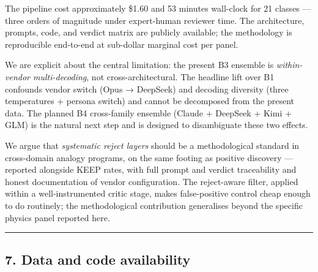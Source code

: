 \documentclass[
  letterpaper,
  11pt]{article}
\begin{document}
The pipeline cost approximately \$1.60 and 53 minutes wall-clock for 21
classes --- three orders of magnitude under expert-human reviewer time.
The architecture, prompts, code, and verdict matrix are publicly
available; the methodology is reproducible end-to-end at sub-dollar
marginal cost per panel.

We are explicit about the central limitation: the present B3 ensemble is
\emph{within-vendor multi-decoding}, not cross-architectural. The
headline lift over B1 confounds vendor switch (Opus → DeepSeek) and
decoding diversity (three temperatures + persona switch) and cannot be
decomposed from the present data. The planned B4 cross-family ensemble
(Claude + DeepSeek + Kimi + GLM) is the natural next step and is
designed to disambiguate these two effects.

We argue that \emph{systematic reject layers} should be a methodological
standard in cross-domain analogy programs, on the same footing as
positive discovery --- reported alongside KEEP rates, with full prompt
and verdict traceability and honest documentation of vendor
configuration. The reject-aware filter, applied within a
well-instrumented critic stage, makes false-positive control cheap
enough to do routinely; the methodological contribution generalises
beyond the specific physics panel reported here.

\begin{center}\rule{0.5\linewidth}{0.5pt}\end{center}

\subsection{7. Data and code
availability}\label{data-and-code-availability}
\end{document}
